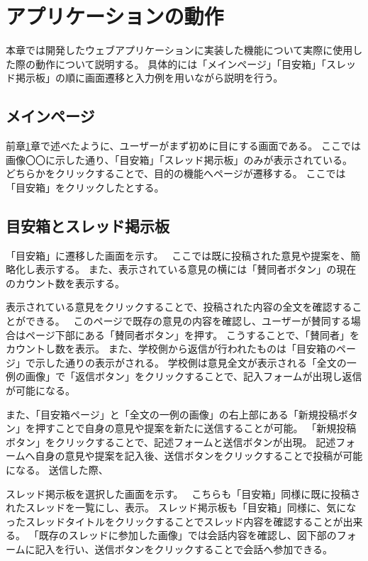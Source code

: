\documentclass[main]{subfiles}
\begin{document}
\chapter{アプリケーションの動作}
\label{cha:behavior}

本章では開発したウェブアプリケーションに実装した機能について実際に使用した際の動作について説明する。
具体的には「メインページ」「目安箱」「スレッド掲示板」の順に画面遷移と入力例を用いながら説明を行う。


\section{メインページ}

前章\ref{cha:behavior}章で述べたように、ユーザーがまず初めに目にする画面である。
ここでは画像〇〇に示した通り、「目安箱」「スレッド掲示板」のみが表示されている。
どちらかをクリックすることで、目的の機能へページが遷移する。
ここでは「目安箱」をクリックしたとする。


\section{目安箱とスレッド掲示板}

「目安箱」に遷移した画面を示す。　%
ここでは既に投稿された意見や提案を、簡略化し表示する。
また、表示されている意見の横には「賛同者ボタン」の現在のカウント数を表示する。

表示されている意見をクリックすることで、投稿された内容の全文を確認することができる。　%
このページで既存の意見の内容を確認し、ユーザーが賛同する場合はページ下部にある「賛同者ボタン」を押す。
こうすることで、「賛同者」をカウントし数を表示。
また、学校側から返信が行われたものは「目安箱のページ」で示した通りの表示がされる。
学校側は意見全文が表示される「全文の一例の画像」で「返信ボタン」をクリックすることで、記入フォームが出現し返信が可能になる。

また、「目安箱ページ」と「全文の一例の画像」の右上部にある「新規投稿ボタン」を押すことで自身の意見や提案を新たに送信することが可能。
「新規投稿ボタン」をクリックすることで、記述フォームと送信ボタンが出現。
記述フォームへ自身の意見や提案を記入後、送信ボタンをクリックすることで投稿が可能になる。
送信した際、

スレッド掲示板を選択した画面を示す。　%
こちらも「目安箱」同様に既に投稿されたスレッドを一覧にし、表示。
スレッド掲示板も「目安箱」同様に、気になったスレッドタイトルをクリックすることでスレッド内容を確認することが出来る。
「既存のスレッドに参加した画像」では会話内容を確認し、図下部のフォームに記入を行い、送信ボタンをクリックすることで会話へ参加できる。
\end{document}
